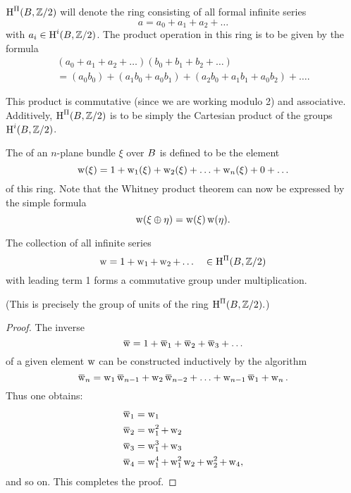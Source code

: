 \documentclass[../main]{subfiles}
\begin{document}
\begin{definition}
$\operatorname{H}^{\Pi}(B,\mathbb{Z}/2)$\index{$\homology^\Pi$} will denote the ring consisting of all formal infinite series
\[
a=a_{0}+a_{1}+a_{2}+\ldots
\]
with $a_i \in \operatorname{H}^{i}(B, \mathbb{Z}/2)$. The product operation in this ring is to be given by the formula
\begin{align*}
(a_{0}+a_{1}+a_{2}+\ldots)(b_{0}+b_{1}+b_{2}+\ldots) \\
=(a_{0} b_{0})+ (a_{1} b_{0}+a_{0} b_{1})+(a_{2} b_{0}+a_{1} b_{1}+a_{0} b_{2})+\ldots.
\end{align*}

This product is commutative (since we are working modulo 2) and associative. Additively, $\operatorname{H}^\Pi(B,\mathbb{Z} / 2)$ is to be simply the Cartesian product of the groups $\operatorname{H}^i(B, \mathbb{Z} / 2)$.
\end{definition}

The  of an $n$-plane bundle $\xi$ over $B$ is defined to be the element
\[
\operatorname{w}(\xi)=1+\operatorname{w}_1(\xi)+\operatorname{w}_2(\xi)+\ldots+\operatorname{w}_n(\xi)+0+\ldots
\]
of this ring. Note that the Whitney product theorem can now be expressed by the simple formula
\[
\operatorname{w}(\xi \oplus \eta)=\operatorname{w}(\xi) \operatorname{w}(\eta) .
\]
\begin{lemma}
\label{lem:04.01}
The collection of all infinite series
\[
\operatorname{w}=1+\operatorname{w}_{1}+\operatorname{w}_{2}+\ldots \quad \in \operatorname{H}^{\Pi}(B, \mathbb{Z} / 2)
\]
with leading term 1 forms a commutative group under multiplication.
\end{lemma}

(This is precisely the group of units of the ring $\operatorname{H}^{\Pi}(B, \mathbb{Z} / 2) .$)

\begin{proof}
The inverse
\[
\xoverline{\sw}=1+\xoverline{\sw}_{1}+\xoverline{\sw}_{2}+\xoverline{\sw}_{3}+\ldots
\]
of a given element $\operatorname{w}$ can be constructed inductively by the algorithm
\[
\xoverline{\sw}_{n}=\sw_{1} \xoverline{\sw}_{n-1}+\sw_{2} \xoverline{\sw}_{n-2}+\ldots+\sw_{n-1} \xoverline{\sw}_{1}+\sw_{n} .
\]
Thus one obtains:
\begin{align*}
\xoverline{\sw}_{1}&=\sw_{1} \\
\xoverline{\sw}_{2}&=\sw_{1}^{2}+\sw_{2} \\
\xoverline{\sw}_{3}&=\sw_{1}^{3}+\sw_{3} \\
\xoverline{\sw}_{4}&=\sw_{1}^{4}+\sw_{1}^{2}\sw_{2}+\sw_{2}^{2}+\sw_{4},
\end{align*}
and so on. This completes the proof.
\end{proof}
\end{document}
